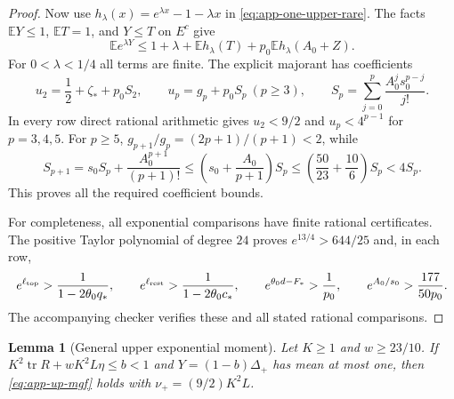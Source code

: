 \documentclass[11pt,a4paper]{article}
\numberwithin{equation}{section}
\newtheorem{lemma}[theorem]{Lemma}
\begin{document}
\begin{proof}
Now use $h_\lambda(x)=e^{\lambda x}-1-\lambda x$ in
\eqref{eq:app-one-upper-rare}.
The facts $\mathbb EY\le1$, $\mathbb ET=1$, and $Y\le T$ on $E^c$
give
\[
 \mathbb Ee^{\lambda Y}
 \le1+\lambda+\mathbb Eh_\lambda(T)+p_0\mathbb Eh_\lambda(A_0+Z).
\]
For $0<\lambda<1/4$ all terms are finite.
The explicit majorant has coefficients
\[
 u_2=\frac12+\zeta_*+p_0S_2,\qquad
 u_p=g_p+p_0S_p\ (p\ge3),\qquad
 S_p=\sum_{j=0}^p\frac{A_0^j s_0^{p-j}}{j!}.
\]
In every row direct rational arithmetic gives
$u_2<9/2$ and $u_p<4^{p-1}$ for $p=3,4,5$.
For $p\ge5$, $g_{p+1}/g_p=(2p+1)/(p+1)<2$, while
\[
 S_{p+1}=s_0S_p+\frac{A_0^{p+1}}{(p+1)!}
 \le\left(s_0+\frac{A_0}{p+1}\right)S_p
 \le\left(\frac{50}{23}+\frac{10}{6}\right)S_p<4S_p.
\]
This proves all the required coefficient bounds.

For completeness, all exponential comparisons have finite rational certificates.
The positive Taylor polynomial of degree $24$ proves
$e^{13/4}>644/25$ and, in each row,
\[
 e^{\ell_{\rm top}}>\frac1{1-2\theta_0q_*},\qquad
 e^{\ell_{\rm rest}}>\frac1{1-2\theta_0c_*},\qquad
 e^{\theta_0d-F_*}>\frac1{p_0},\qquad
 e^{A_0/s_0}>\frac{177}{50p_0}.
\]
The accompanying checker verifies these and all stated rational comparisons.
\end{proof}

\begin{lemma}[General upper exponential moment]\label{app:general-upper-mgf-refined}
Let $K\ge1$ and $w\ge23/10$.
If $K^2\operatorname{tr}R+wK^2L\eta\le b<1$ and
$Y=(1-b)\Delta_+$ has mean at most one, then
\eqref{eq:app-up-mgf} holds with $\nu_+=(9/2)K^2L$.
\end{lemma}
\end{document}
